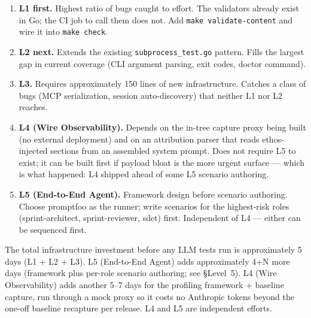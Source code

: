 \documentclass[a4paper,10pt]{article}
\newcommand{\pkg}[1]{\texttt{#1}}
\newcommand{\cmd}[1]{\texttt{#1}}
\begin{document}
\begin{enumerate}
  \item \textbf{L1 first.}  Highest ratio of bugs caught to effort.
    The validators already exist in Go; the CI job to call them does
    not.  Add \cmd{make validate-content} and wire it into
    \cmd{make check}.

  \item \textbf{L2 next.}  Extends the existing
    \pkg{subprocess\_test.go} pattern.  Fills the largest gap in
    current coverage (CLI argument parsing, exit codes, doctor
    command).

  \item \textbf{L3.}  Requires approximately 150 lines of new
    infrastructure.  Catches a class of bugs (MCP serialization,
    session auto-discovery) that neither L1 nor L2 reaches.

  \item \textbf{L4 (Wire Observability).}  Depends on the in-tree
    capture proxy being built (no external deployment) and on an
    attribution parser that reads ethos-injected sections from an
    assembled system prompt.  Does not require L5 to exist; it can
    be built first if payload bloat is the more urgent surface ---
    which is what happened: L4 shipped ahead of some L5 scenario
    authoring.

  \item \textbf{L5 (End-to-End Agent).}  Framework design before
    scenario authoring.  Choose promptfoo as the runner; write
    scenarios for the highest-risk roles (sprint-architect,
    sprint-reviewer, sdet) first.  Independent of L4 --- either can
    be sequenced first.
\end{enumerate}

The total infrastructure investment before any LLM tests run is
approximately 5 days (L1 + L2 + L3).  L5 (End-to-End Agent) adds
approximately 4+N more days (framework plus per-role scenario
authoring; see \S Level~5).  L4 (Wire Observability) adds another
5--7 days for the profiling framework + baseline capture, run
through a mock proxy so it costs no Anthropic tokens beyond the
one-off baseline recapture per release.  L4 and L5 are independent
efforts.
\end{document}
